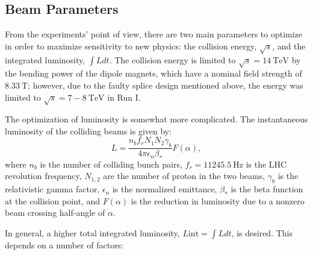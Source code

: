 \subsection{Beam Parameters}
From the experiments' point of view, there are two main parameters to optimize in order to maximize sensitivity to new physics: the collision energy, $\sqrt{s}$, and the integrated luminosity, $\int L dt$. The collision energy is limited to $\sqrt{s}=14~\mbox{TeV}$ by the bending power of the dipole magnets, which have a nominal field strength of $8.33~\mbox{T}$; however, due to the faulty splice design mentioned above, the energy was limited to $\sqrt{s}=7-8~\mbox{TeV}$ in Run I. 

The optimization of luminosity is somewhat more complicated.  The instantaneous luminosity of the colliding beams is given by:
\begin{equation}\label{eqn:lumi}
	L = \frac{n_b f_r N_1 N_2 \gamma_b}{4\pi \epsilon_n \beta_{*}} F(\alpha),
\end{equation}
where $n_b$ is the number of colliding bunch pairs, $f_r=11245.5~\mbox{Hz}$ is the LHC revolution frequency, $N_{1,2}$ are the number of proton in the two beams, $\gamma_b$ is the relativistic gamma factor, $\epsilon_n$ is the normalized emittance, $\beta_{*}$ is the beta function at the collision point, and $F(\alpha)$ is the reduction in luminosity due to a nonzero beam crossing half-angle of $\alpha$. 


In general, a higher total integrated luminosity, $L{\mathrm{int}}=\int L dt$, is desired. This depends on a number of factors:


